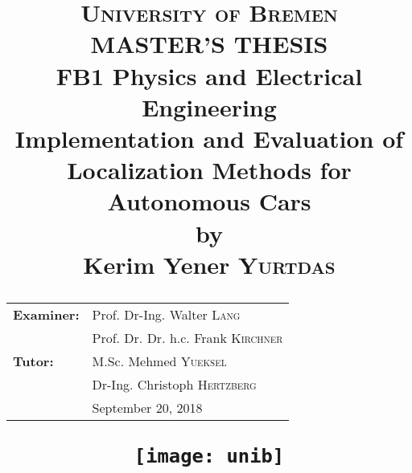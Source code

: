 \title{
\textsc{University of Bremen}\\
\vspace{15pt}
\textbf{\large MASTER'S THESIS}\\
\vspace{5pt}
\large FB1 Physics and Electrical Engineering \\
\vspace{5pt}
{\LARGE \textbf{Implementation and Evaluation of Localization Methods for Autonomous Cars}\\
\large by\\ Kerim Yener \textsc{Yurtdas}}
\vspace{2cm}
\\
\begin{tabular}{l l}
    \textbf{Examiner:} &Prof. Dr-Ing. Walter \textsc{Lang} \\
                       &Prof. Dr. Dr. h.c. Frank \textsc{Kirchner} 
\vspace{2cm}
\\
\textbf{Tutor:}        &M.Sc. Mehmed \textsc{Yueksel}\\
                       &Dr-Ing. Christoph \textsc{Hertzberg}
\vspace{4cm}
\\
                       &September 20, 2018
\end{tabular}
\vfill
\centering
\texttt{[image: unib]}}
\date{}
\author{}